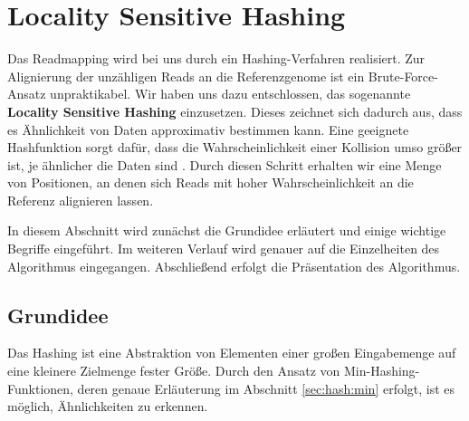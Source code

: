 \chapter{Locality Sensitive Hashing}
\label{sec:lsh}
Das Readmapping wird bei uns durch ein Hashing-Verfahren realisiert.
Zur Alignierung der unzähligen Reads an die Referenzgenome ist ein Brute-Force-Ansatz unpraktikabel.
Wir haben uns dazu entschlossen, das sogenannte \textbf{Locality Sensitive Hashing} einzusetzen.
Dieses zeichnet sich dadurch aus, dass es Ähnlichkeit von Daten approximativ bestimmen kann.
Eine geeignete Hashfunktion sorgt dafür, dass die Wahrscheinlichkeit einer Kollision umso größer ist, je ähnlicher die Daten sind \citep{Gionis1999}.
Durch diesen Schritt erhalten wir eine Menge von Positionen, an denen sich Reads mit hoher Wahrscheinlichkeit an die Referenz alignieren lassen.

In diesem Abschnitt wird zunächst die Grundidee erläutert und einige wichtige Begriffe eingeführt.
Im weiteren Verlauf wird genauer auf die Einzelheiten des Algorithmus eingegangen.
Abschließend erfolgt die Präsentation des Algorithmus.
\section{Grundidee}
\label{sec:hash:idee}
Das Hashing ist eine Abstraktion von Elementen einer großen Eingabemenge auf eine kleinere Zielmenge fester Größe.
Durch den Ansatz von Min-Hashing-Funktionen, deren genaue Erläuterung im Abschnitt \ref{sec:hash:min} erfolgt, ist es möglich, Ähnlichkeiten zu erkennen.


